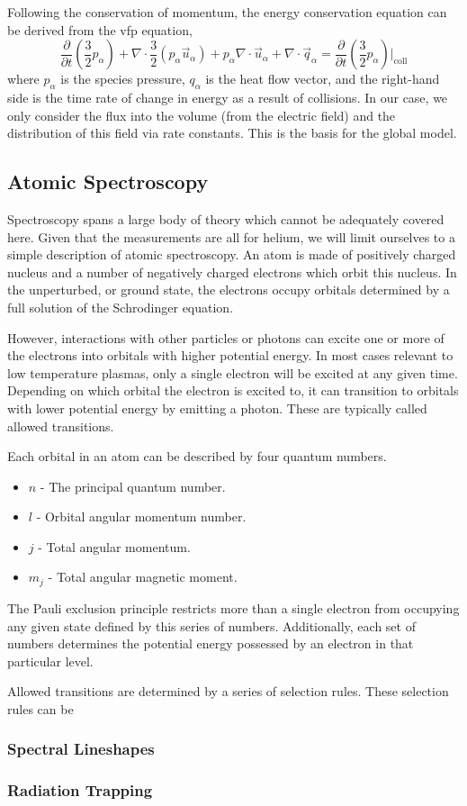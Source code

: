 Following the conservation of momentum, the energy conservation equation
can be derived from the \acs{vfp} equation,
\begin{equation}
  \frac{\partial}{\partial t}\left(\frac{3}{2}p_\alpha\right) 
  + \nabla\cdot\frac{3}{2} (p_\alpha\vec{u}_\alpha)
  + p_\alpha\nabla\cdot\vec{u}_\alpha
  + \nabla\cdot\vec{q}_\alpha
  = \frac{\partial}{\partial
  t}\left(\frac{3}{2}p_\alpha\right)\bigg|_\mathrm{coll}
\end{equation}
where $p_\alpha$ is the species pressure, $q_\alpha$ is the heat flow
vector, and the right-hand side is the time rate of change in energy as
a result of collisions. In our case, we only consider the flux into the
volume (from the electric field) and the distribution of this field via
rate constants. This is the basis for the global model.

\subsection{Atomic Spectroscopy}

Spectroscopy spans a large body of theory which cannot be adequately
covered here. Given that the measurements are all for helium, we will
limit ourselves to a simple description of atomic spectroscopy. An atom
is made of positively charged nucleus and a number of negatively charged
electrons which orbit this nucleus. In the unperturbed, or ground state,
the electrons occupy orbitals determined by a full solution of the
Schrodinger equation.

However, interactions with other particles or photons can excite one or
more of the electrons into orbitals with higher potential energy. In
most cases relevant to low temperature plasmas, only a single electron
will be excited at any given time. Depending on which orbital the
electron is excited to, it can transition to orbitals with lower
potential energy by emitting a photon. These are typically called
allowed transitions.

Each orbital in an atom can be described by four quantum numbers.
\begin{itemize}
  \item $n$ - The principal quantum number.
  \item $l$ - Orbital angular momentum number.
  \item $j$ - Total angular momentum.
  \item $m_j$ - Total angular magnetic moment.
\end{itemize}
The Pauli exclusion principle restricts more than a single electron from
occupying any given state defined by this series of numbers.
Additionally, each set of numbers determines the potential energy
possessed by an electron in that particular level. 

Allowed transitions are determined by a series of selection rules. These
selection rules can be 

\subsubsection{Spectral Lineshapes}

\subsubsection{Radiation Trapping}
